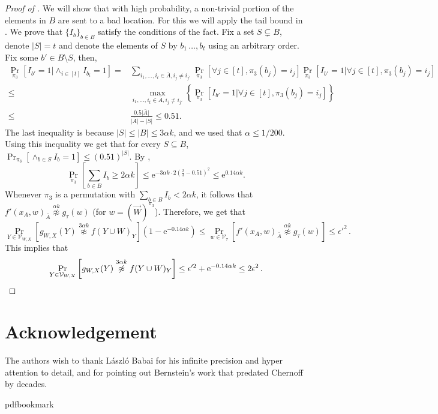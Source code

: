 \documentclass[11pt]{article}
\numberwithin{equation}{section}
\theoremstyle{definition}
\theoremstyle{plain}
\newcommand{\eee}{\mathrm e}
\newcommand{\Prob}[2][]{\Pr_{{#1}}\left[#2\right]} %
\newcommand{\Paren}[1]{\left(#1\right)} %
\newcommand{\Brac}[1]{\left[#1\right]} %
\newcommand{\abs}[1]{\lvert#1\rvert} %
\newcommand{\set}[1]{\{#1\}} %
\newcommand{\Set}[1]{\left\{#1\right\}} %
\newcommand\f{f} %
\newcommand\setf{f} %
\newcommand{\g}{g} %
\newcommand\neqg[1]{\stackrel{{#1}}{ \not\approx}} %
\newcommand\cons{\mathcal{V}} %
\newcommand\rest[1]{{\bar{#1}}}  %
\begin{document}
\begin{proof}[Proof of ]
	We will show that with high probability, a non-trivial portion of the elements in $B$ are sent to a bad location. For this we will apply the tail bound in . We prove that $\set{I_b}_{b\in B}$ satisfy the conditions of the fact.
	Fix a set $S\subsetneq B$, denote $\abs{S}=t$ and denote  the elements of $S$ by $b_1\,\ldots,b_t$ using an arbitrary order. Fix some $b'\in B\setminus S$, then,
	\begin{align*}
		\Pr_{\pi_3}[I_{b'}=1|\wedge_{i\in[t]}I_{b_i}=1] =& \sum_{i_1,\ldots,i_{t}\in\rest{A},i_j\neq i_{j'}}\Pr_{\pi_3}\Brac{\forall j\in [t],\pi_3(b_j)=i_j}\Pr_{\pi_3}\Brac{I_{b'}=1|\forall j\in [t],\pi_3(b_j)=i_j}\\ \leq&\max_{i_1,\ldots,i_{t}\in\rest{A},i_j\neq i_{j'}}\Set{\Pr_{\pi_3}\Brac{I_{b'}=1|\forall j\in [t],\pi_3(b_j)=i_j}}\\
		\leq& \frac{0.5\abs{\rest{A}}}{\abs{\rest{A}} - \abs{S}}\leq 0.51.
	\end{align*}
	The last inequality is because $\abs{S}\leq\abs{B}\leq 3\alpha k$, and we used that $\alpha \leq 1/200$. Using this inequality we get that for every $S\subseteq B$, $\Pr_{\pi_3}\Brac{\wedge_{b\in S}I_b=1}\leq (0.51)^{\abs{S}}$.
	By ,
	\[ \Pr_{\pi_3}\Brac{\sum_{b\in B}I_b \geq 2\alpha k}\leq \eee^{-3\alpha k \cdot 2\Paren{\frac{2}{3}-0.51}^2}\leq \eee^{0.14 \alpha k}.  \]
	Whenever $\pi_3$ is a permutation with $\sum_{b\in B}I_b < 2\alpha k$, it follows that $\f'(x_A,w)_\rest{A}\neqg{\alpha k} \g_\tau(w)$ (for $w=(\vec W)^{\pi_3}$).
	Therefore, we get that
\[ \Prob[Y\in \cons_{W,X}]{\g_{W,X}(Y)\neqg{3\alpha k} \setf(Y\cup W)_Y}
%
\left(1-\eee^{-0.14\alpha k} \right)   %
\leq \Prob[w\in \cons_\tau]{\f'(x_A,w)_\rest{A}\neqg{\alpha k} \g_\tau(w)}\leq\epsilon'^2\,.\]
%
This implies that  %
	\[\Prob[Y\in \cons_{W,X}]{\g_{W,X}(Y)\neqg{3\alpha k} \setf(Y\cup W)_Y}\leq\epsilon'^2 + 
%
\eee^{-0.14\alpha k} \leq 2\epsilon^2\,.   %
 \qedhere \]    %
\end{proof}


\section*{Acknowledgement}
The authors wish to thank L\'aszl\'o Babai for his infinite precision 
and hyper attention to detail, and for pointing out Bernstein's work 
that predated Chernoff by decades.



\newcommand{\prelim}{Preliminary version in\ }\newcommand{\prelims}{Preliminary
  versions in\ }
\providecommand{\bibhead}[1]{}
\expandafter\ifx\csname pdfbookmark\endcsname\relax%
  \providecommand{\tocrefpdfbookmark}{}
\else\providecommand{\tocrefpdfbookmark}{%
   \hypertarget{tocreferences}{}%
   \pdfbookmark[1]{References}{tocreferences}}%
\fi
\end{document}
